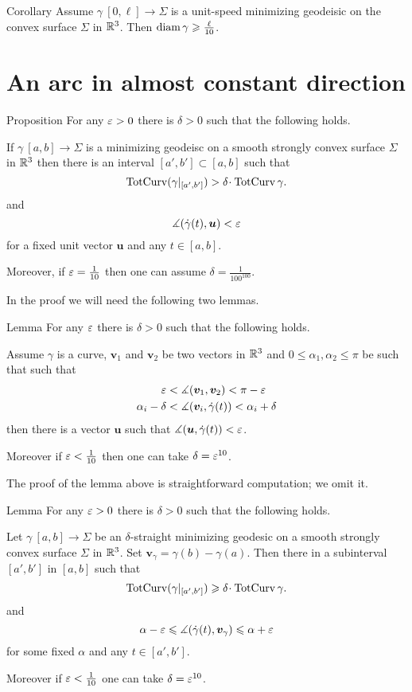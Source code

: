 \documentclass[a4paper,10pt]{amsart}
\begin{document}
\begin{thm}{Corollary}
Assume $\gamma\:[0,\ell]\to \Sigma$ is a unit-speed minimizing geodeisic on the convex surface $\Sigma$ in $\mathbb{R}^3$.
Then $\operatorname{diam} \gamma\geqslant \tfrac\ell{10}$.
\end{thm}


\section{An arc in almost constant direction}

\begin{thm}{Proposition}\label{prop:almost-const}
For any $\varepsilon>0$ there is $\delta>0$ such that the following holds.

If $\gamma\:[a,b]\to\Sigma$ is a minimizing geodeisc 
on a smooth strongly convex surface $\Sigma$ in $\mathbb{R}^3$
then there is an interval $[a',b']\subset[a,b]$
such that 
\[\tc(\gamma|_{[a',b']})>\delta\cdot\tc\gamma.\]
and 
\[\measuredangle(\dot\gamma(t),\bm{u})<\varepsilon\] 
for a fixed unit vector $\bm{u}$
and any $t\in[a,b]$.

Moreover, if $\varepsilon=\tfrac1{10}$ then one can assume $\delta=\tfrac1{100^{100}}$.
\end{thm}

In the proof we will need the following two lemmas.

\begin{thm}{Lemma}\label{lem:almost-const-angles}
For any $\varepsilon$ there is $\delta>0$ such that the following holds.

Assume $\gamma$ is a curve,
$\bm{v}_1$ and $\bm{v}_2$  be two vectors in $\mathbb{R}^3$
and $0\le\alpha_1,\alpha_2\le\pi$ be such that
such that 
\begin{align*}
\varepsilon
&<\measuredangle(\bm{v}_1,\bm{v}_2)<\pi-\varepsilon
\\
\alpha_i-\delta
&<\measuredangle(\bm{v}_i,\dot\gamma(t))< \alpha_i+\delta
\end{align*}
then there is a vector $\bm{u}$ such that
$\measuredangle(\bm{u},\dot\gamma(t))<\varepsilon$.

Moreover if $\varepsilon<\tfrac1{10}$ 
then one can take $\delta=\varepsilon^{10}$.
\end{thm}

The proof of the lemma above 
is straightforward computation;
we omit it.

\begin{thm}{Lemma}\label{lem:almost-const}
For any $\varepsilon>0$ there is $\delta>0$
such that the following holds.

Let $\gamma\:[a,b]\to\Sigma$ 
be an $\delta$-straight minimizing geodesic 
on a smooth strongly convex surface $\Sigma$ in $\mathbb{R}^3$.
Set $\bm{v}_\gamma=\gamma(b)-\gamma(a)$.
Then there in a subinterval $[a',b']$ in $[a,b]$
such that 
\[\tc(\gamma|_{[a',b']})\ge\delta\cdot\tc\gamma.\]
and 
\[\alpha-\varepsilon
\leqslant
\measuredangle(\dot\gamma(t),\bm{v}_\gamma)
\leqslant\alpha+\varepsilon\] 
for some fixed $\alpha$
and
any $t\in[a',b']$.

Moreover if $\varepsilon<\tfrac1{10}$ one can take $\delta=\varepsilon^{10}$.
\end{thm}
\end{document}
